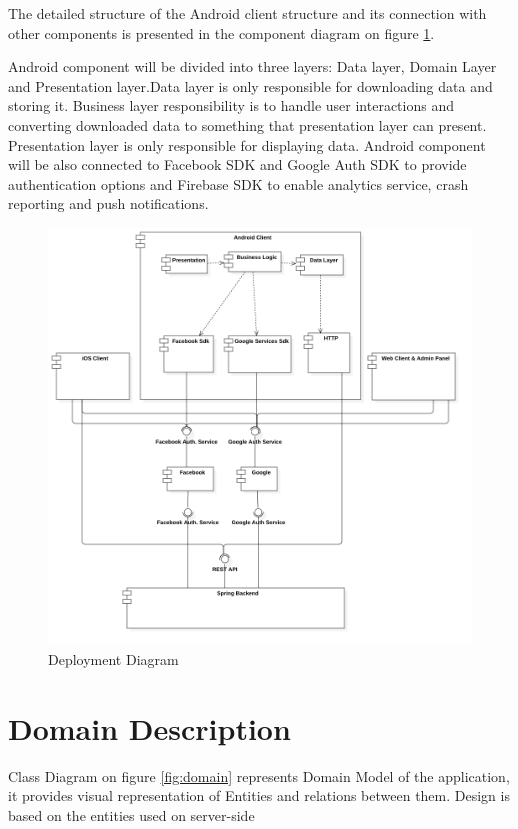 \documentclass[thesis=B,english]{FITthesis}[2012/10/20]
\begin{document}
The detailed structure of the Android client structure and its connection with other components is presented in the component diagram on figure \ref{fig:deploy}. 

 Android component will be divided into three layers: Data layer, Domain Layer and Presentation layer.Data layer is only responsible for downloading data and storing it. Business layer responsibility is to handle user interactions and converting downloaded data to something that presentation layer can present. Presentation layer is only responsible for displaying data. Android component will be also connected to Facebook SDK and Google Auth SDK to provide authentication options  and Firebase SDK to enable analytics service, crash reporting and push notifications.
\newpage
\begin{figure}[H]
  \includegraphics[scale=0.3]{deployment}
  \caption{Deployment Diagram}
  \label{fig:deploy}
\end{figure}


\newpage
\section{Domain Description}
 Class Diagram on figure \ref{fig:domain} represents Domain Model of the application, it provides visual representation of Entities and relations between them. Design is based on the entities used on server-side
\end{document}
